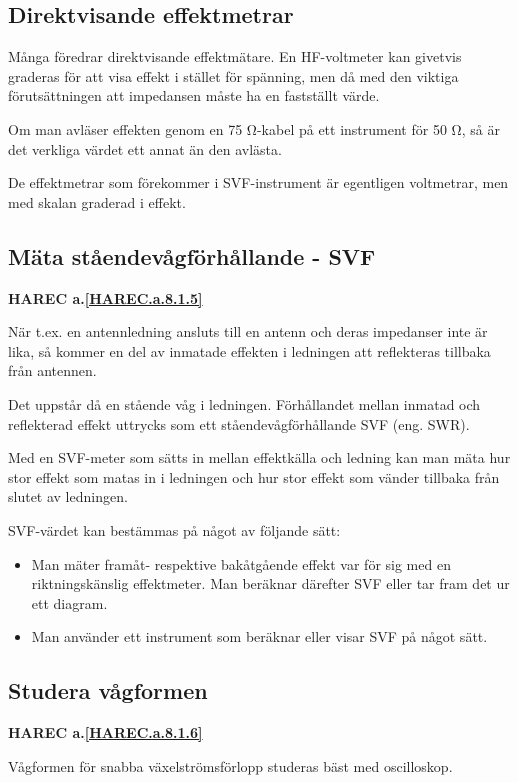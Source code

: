 \subsection{Direktvisande effektmetrar}

Många föredrar direktvisande effektmätare.  En HF-voltmeter kan
givetvis graderas för att visa effekt i stället för spänning, men då
med den viktiga förutsättningen att impedansen måste ha en fastställt
värde.

Om man avläser effekten genom en 75 Ω-kabel på ett instrument för 50
Ω, så är det verkliga värdet ett annat än den avlästa.

De effektmetrar som förekommer i SVF-instrument är egentligen
voltmetrar, men med skalan graderad i effekt.

\subsection{Mäta ståendevågförhållande - SVF}
\textbf{
HAREC a.\ref{HAREC.a.8.1.5}\label{myHAREC.a.8.1.5}
}
\label{mäta ståendevåg}

När t.ex. en antennledning ansluts till en antenn och deras impedanser
inte är lika, så kommer en del av inmatade effekten i ledningen att
reflekteras tillbaka från antennen.

Det uppstår då en stående våg i ledningen. Förhållandet mellan inmatad
och reflekterad effekt uttrycks som ett ståendevågförhållande SVF
(eng. SWR).

Med en SVF-meter som sätts in mellan effektkälla och ledning kan man
mäta hur stor effekt som matas in i ledningen och hur stor effekt som
vänder tillbaka från slutet av ledningen.

SVF-värdet kan bestämmas på något av följande sätt:
\begin{itemize}
\item Man mäter framåt- respektive bakåtgående effekt var för sig med
  en riktningskänslig effektmeter. Man beräknar därefter SVF eller
  tar fram det ur ett diagram.
\item Man använder ett instrument som beräknar eller visar SVF på
  något sätt.
\end{itemize}

\subsection{Studera vågformen}
\textbf{
HAREC a.\ref{HAREC.a.8.1.6}\label{myHAREC.a.8.1.6}
}

Vågformen för snabba växelströmsförlopp studeras bäst med oscilloskop.

